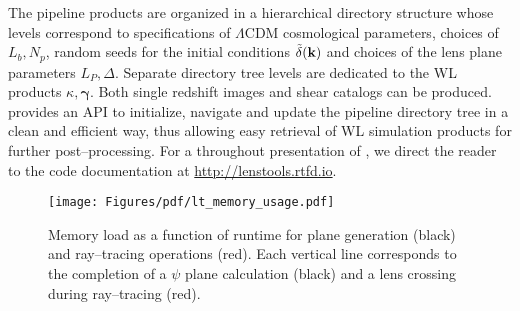 The pipeline products are organized in a hierarchical directory structure whose levels correspond to specifications of $\Lambda$CDM cosmological parameters, choices of $L_b,N_p$, random seeds for the initial conditions $\tilde{\delta}(\mathbf{k})$ and choices of the lens plane parameters $L_P,\Delta$. Separate directory tree levels are dedicated to the WL products $\kappa,\pmb{\gamma}$. Both single redshift images and shear catalogs can be produced. \LT\, provides an API to initialize, navigate and update the pipeline directory tree in a clean and efficient way, thus allowing easy retrieval of WL simulation products for further post--processing. For a throughout presentation of \LT, we direct the reader to the code documentation at \url{http://lenstools.rtfd.io}. 
\begin{figure}
\begin{center}
\texttt{[image: Figures/pdf/lt\_memory\_usage.pdf]}
\end{center}
\caption{Memory load as a function of runtime for plane generation (black) and ray--tracing operations (red). Each vertical line corresponds to the completion of a $\psi$ plane calculation (black) and a lens crossing during ray--tracing (red).}
\label{fig:3:lt-memory}
\end{figure}
    

%